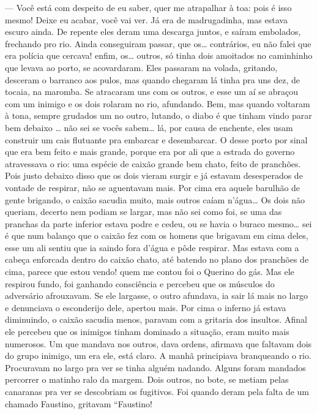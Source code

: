 --- Você está com despeito de eu saber, quer me atrapalhar à toa: pois é
isso mesmo! Deixe eu acabar, você vai ver. Já era de madrugadinha, mas
estava escuro ainda. De repente eles deram uma descarga juntos, e saíram
embolados, frechando pro rio. Ainda conseguiram passar, que os\ldots{}
contrários, eu não falei que era polícia que cercava! enfim, os\ldots{}
outros, só tinha dois amoitados no caminhinho que levava ao porto, se
acovardaram. Eles passaram na volada, gritando, desceram o barranco aos
pulos, mas quando chegaram lá tinha pra uns dez, de tocaia, na maromba.
Se atracaram uns com os outros, e esse um aí se abraçou com um inimigo e
os dois rolaram no rio, afundando. Bem, mas quando voltaram à tona,
sempre grudados um no outro, lutando, o diabo é que tinham vindo parar
bem debaixo \ldots{} não sei se vocês sabem\ldots{} lá, por causa de enchente,
eles usam construir um cais flutuante pra embarcar e desembarcar. O
desse porto por sinal que era bem feito e mais grande, porque era por
ali que a estrada do governo atravessava o rio: uma espécie de caixão
grande bem chato, feito de pranchões. Pois justo debaixo disso que os
dois vieram surgir e já estavam desesperados de vontade de respirar, não
se aguentavam mais. Por cima era aquele barulhão de gente brigando, o
caixão sacudia muito, mais outros caíam n'água\ldots{} Os dois não queriam,
decerto nem podiam se largar, mas não sei como foi, se uma das pranchas
da parte inferior estava podre e cedeu, ou se havia o buraco mesmo\ldots{}
sei é que num balanço que o caixão fez com os homens que brigavam em
cima deles, esse um ali sentiu que ia saindo fora d'água e pôde
respirar. Mas estava com a cabeça enforcada dentro do caixão chato, até
batendo no plano dos pranchões de cima, parece que estou vendo! quem me
contou foi o Querino do gás. Mas ele respirou fundo, foi ganhando
consciência e percebeu que os músculos do adversário afrouxavam. Se ele
largasse, o outro afundava, ia sair lá mais no largo e denunciava o
esconderijo dele, apertou mais. Por cima o inferno já estava diminuindo,
o caixão sacudia menos, paravam com a gritaria dos insultos. Afinal ele
percebeu que os inimigos tinham dominado a situação, eram muito mais
numerosos. Um que mandava nos outros, dava ordens, afirmava que faltavam
dois do grupo inimigo, um era ele, está claro. A manhã principiava
branqueando o rio. Procuravam no largo pra ver se tinha alguém nadando.
Alguns foram mandados percorrer o matinho ralo da margem. Dois outros,
no bote, se metiam pelas canaranas pra ver se descobriam os fugitivos.
Foi quando deram pela falta de um chamado Faustino, gritavam ``Faustino!
